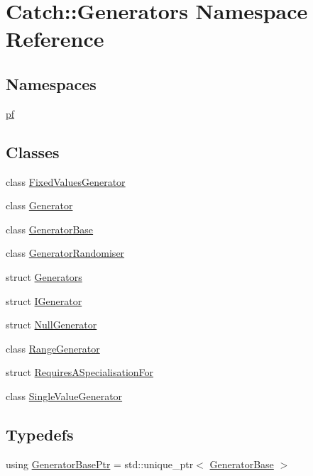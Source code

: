 \hypertarget{namespace_catch_1_1_generators}{}\section{Catch\+:\+:Generators Namespace Reference}
\label{namespace_catch_1_1_generators}
\subsection*{Namespaces}
\begin{DoxyCompactItemize}
\item 
 \mbox{\hyperlink{namespace_catch_1_1_generators_1_1pf}{pf}}
\end{DoxyCompactItemize}
\subsection*{Classes}
\begin{DoxyCompactItemize}
\item 
class \mbox{\hyperlink{class_catch_1_1_generators_1_1_fixed_values_generator}{Fixed\+Values\+Generator}}
\item 
class \mbox{\hyperlink{class_catch_1_1_generators_1_1_generator}{Generator}}
\item 
class \mbox{\hyperlink{class_catch_1_1_generators_1_1_generator_base}{Generator\+Base}}
\item 
class \mbox{\hyperlink{class_catch_1_1_generators_1_1_generator_randomiser}{Generator\+Randomiser}}
\item 
struct \mbox{\hyperlink{struct_catch_1_1_generators_1_1_generators}{Generators}}
\item 
struct \mbox{\hyperlink{struct_catch_1_1_generators_1_1_i_generator}{I\+Generator}}
\item 
struct \mbox{\hyperlink{struct_catch_1_1_generators_1_1_null_generator}{Null\+Generator}}
\item 
class \mbox{\hyperlink{class_catch_1_1_generators_1_1_range_generator}{Range\+Generator}}
\item 
struct \mbox{\hyperlink{struct_catch_1_1_generators_1_1_requires_a_specialisation_for}{Requires\+A\+Specialisation\+For}}
\item 
class \mbox{\hyperlink{class_catch_1_1_generators_1_1_single_value_generator}{Single\+Value\+Generator}}
\end{DoxyCompactItemize}
\subsection*{Typedefs}
\begin{DoxyCompactItemize}
\item 
using \mbox{\hyperlink{namespace_catch_1_1_generators_a24d632802570d314c18d00a2ea5e33d1}{Generator\+Base\+Ptr}} = std\+::unique\+\_\+ptr$<$ \mbox{\hyperlink{class_catch_1_1_generators_1_1_generator_base}{Generator\+Base}} $>$
\end{DoxyCompactItemize}
